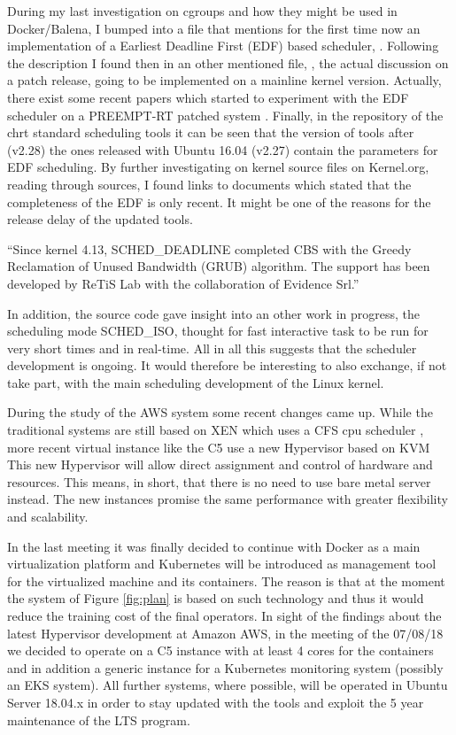 \documentclass[]{scrartcl}
\begin{document}
During my last investigation on cgroups and how they might be used in Docker/Balena, I bumped into a file that mentions for the first time now an implementation of a Earliest Deadline First (EDF) based scheduler, \cite{kernel01}.
Following the description I found then in an other mentioned file,
\cite{kernel02}, the actual discussion on a patch release, going to be implemented on a mainline kernel version. Actually, there exist some recent papers which started to experiment with the EDF scheduler on a PREEMPT-RT patched system \cite{Buelnaetal2017}.
Finally, in the repository of the chrt standard scheduling tools \cite{schtools01} it can be seen that the version of tools after (v2.28) the ones released with Ubuntu 16.04 (v2.27) contain the parameters for EDF scheduling.
By further investigating on kernel source files on Kernel.org, reading through sources, I found links to documents \cite{wiki01} which stated that the completeness of the EDF is only recent.
It might be one of the reasons for the release delay of the updated tools.
\bigskip

``Since kernel 4.13, SCHED\_DEADLINE completed CBS with the Greedy Reclamation of Unused Bandwidth (GRUB) algorithm. The support has been developed by ReTiS Lab with the collaboration of Evidence Srl.''
\bigskip

In addition, the source code gave insight into an other work in progress, the scheduling mode SCHED\_ISO, thought for fast interactive task to be run for very short times and in real-time. All in all this suggests that the scheduler development is ongoing. It would therefore be interesting to also exchange, if not take part, with the main scheduling development of the Linux kernel.

During the study of the AWS system some recent changes came up. While the traditional systems are still based on XEN which uses a CFS cpu scheduler \cite{xen01}, more recent virtual instance like the C5 use a new Hypervisor based on KVM \cite{amazon01} 
This new Hypervisor will allow direct assignment and control of hardware and resources.
This means, in short, that there is no need to use bare metal server instead. The new instances promise the same performance with greater flexibility and scalability.

In the last meeting it was finally decided to continue with Docker as a main virtualization platform and Kubernetes will be introduced as management tool for the virtualized machine and its containers. The reason is that at the moment the system of Figure \ref{fig:plan} is based on such technology and thus it would reduce the training cost of the final operators. In sight of the findings about the latest Hypervisor development at Amazon AWS, in the meeting of the 07/08/18 we decided to operate on a C5 instance with at least 4 cores for the containers and in addition a generic instance for a Kubernetes monitoring system (possibly an EKS system). All further systems, where possible, will be operated in Ubuntu Server 18.04.x in order to stay updated with the tools and exploit the 5 year maintenance of the LTS program.
\end{document}
